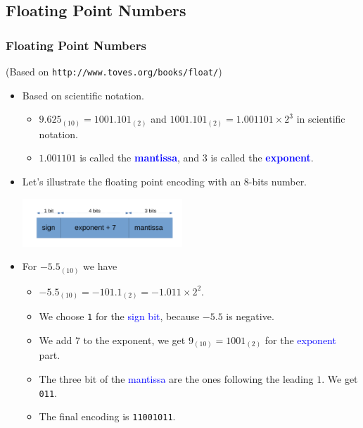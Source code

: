 \documentclass{beamer}
\begin{document}
\subsection{Floating Point Numbers}

\begin{frame}%
\frametitle{Floating Point Numbers}
\tiny
(Based on \texttt{http://www.toves.org/books/float/})
\scriptsize

\begin{itemize}
\item Based on scientific notation.

  \begin{itemize}
    \scriptsize
  \item $9.625_{(10)} = 1001.101_{(2)}$ and $1001.101_{(2)} = 1.001101 \times 2^3$ in scientific notation.
  \item $1.001101$ is called the \textcolor{blue}{\textbf{mantissa}}, and $3$ is called the \textcolor{blue}{\textbf{exponent}}.
  \end{itemize}

\item Let's illustrate the floating point encoding with an $8$-bits number.
\begin{center}
  \includegraphics[width=6cm]{float1.pdf}
\end{center}

\item For $-5.5_{(10)}$ we have
  \begin{itemize}
    \scriptsize
  \item $-5.5_{(10)} = -101.1_{(2)} = -1.011\times 2^2$.
  \item We choose \texttt{1} for the \textcolor{blue}{sign bit}, because $-5.5$ is negative.
  \item We add $7$ to the exponent, we get $9_{(10)} = 1001_{(2)}$ for the \textcolor{blue}{exponent} part.
  \item The three bit of the \textcolor{blue}{mantissa} are the ones following the leading $1$. We get \texttt{011}.
  \item The final encoding is \texttt{11001011}.
  \end{itemize}

\end{itemize}

\end{frame}
\end{document}

